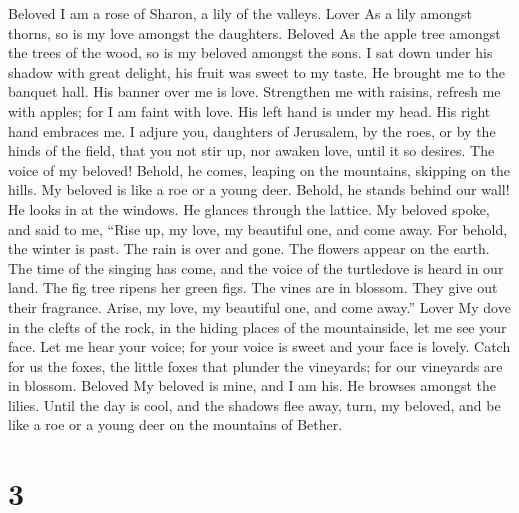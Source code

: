Beloved  I am a rose of Sharon, a lily of the valleys. Lover
 As a lily amongst thorns, so is my love amongst the
daughters. Beloved  As the apple tree amongst the trees of
the wood, so is my beloved amongst the sons. I sat down under his shadow
with great delight, his fruit was sweet to my taste.  He
brought me to the banquet hall. His banner over me is love. 
Strengthen me with raisins, refresh me with apples; for I am faint with
love.  His left hand is under my head. His right hand
embraces me.  I adjure you, daughters of Jerusalem, by the
roes, or by the hinds of the field, that you not stir up, nor awaken
love, until it so desires.  The voice of my beloved! Behold,
he comes, leaping on the mountains, skipping on the hills. 
My beloved is like a roe or a young deer. Behold, he stands behind our
wall! He looks in at the windows. He glances through the lattice.
 My beloved spoke, and said to me, ``Rise up, my love, my
beautiful one, and come away.  For behold, the winter is
past. The rain is over and gone.  The flowers appear on the
earth. The time of the singing has come, and the voice of the turtledove
is heard in our land.  The fig tree ripens her green figs.
The vines are in blossom. They give out their fragrance. Arise, my love,
my beautiful one, and come away.'' Lover  My dove in the
clefts of the rock, in the hiding places of the mountainside, let me see
your face. Let me hear your voice; for your voice is sweet and your face
is lovely.  Catch for us the foxes, the little foxes that
plunder the vineyards; for our vineyards are in blossom. Beloved
 My beloved is mine, and I am his. He browses amongst the
lilies.  Until the day is cool, and the shadows flee away,
turn, my beloved, and be like a roe or a young deer on the mountains of
Bether.

\hypertarget{section-2}{%
\section{3}\label{section-2}}

